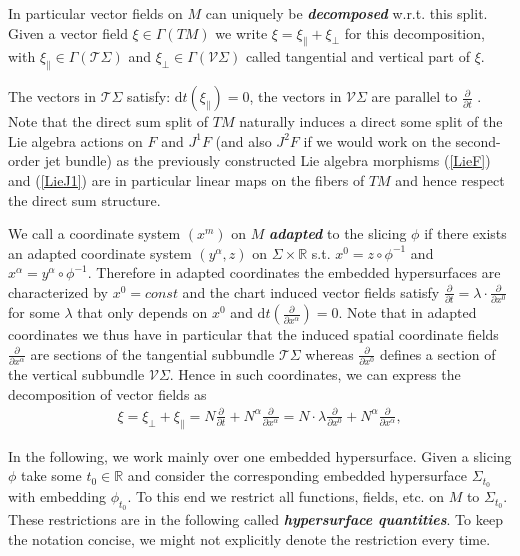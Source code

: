 \documentclass[a4paper,12pt, DIV=14, BCOR=5mm, twoside, headsepline, numbers=noenddot]{scrbook}
\begin{document}
In particular vector fields on $M$ can uniquely be \textit{\textbf{decomposed}} w.r.t. this split. Given a vector field $\xi \in \Gamma(TM)$ we write $\xi = \xi_{\parallel} + \xi_{\perp} $ for this decomposition, with $\xi_{\parallel} \in \Gamma(\mathcal{T}\Sigma)$ and $\xi_{\perp} \in \Gamma(\mathcal{V}\Sigma)$ called tangential and vertical part of $\xi$.

The vectors in $\mathcal{T}\Sigma$ satisfy: $\mathrm{d}t(\xi_{\parallel})=0$, the vectors in $\mathcal{V}\Sigma$ are parallel to $\frac{\partial}{\partial t}$  . Note that the direct sum split of $TM$ naturally induces a direct some split of the Lie algebra actions on $F$ and $J^1F$ (and also $J^2F$ if we would work on the second-order jet bundle) as the previously constructed Lie algebra morphisms (\ref{LieF}) and (\ref{LieJ1}) are in particular linear maps on the fibers of $TM$ and hence respect the direct sum structure.

We call a coordinate system $(x^m)$ on $M$ \textit{\textbf{adapted}} to the slicing $\phi$ if there exists an adapted coordinate system $(y^{\alpha},z)$ on $\Sigma \times \mathbb{R}$ s.t. $x^0 = z \circ \phi^{-1}$ and $x^{\alpha} = y^{\alpha} \circ \phi^{-1}$. Therefore in adapted coordinates the embedded hypersurfaces are characterized by $x^0 = const$ and the chart induced vector fields satisfy $\frac{\partial}{\partial t} = \lambda \cdot \frac{\partial}{\partial x^0}$ for some $\lambda$ that only depends on $x^0$ and $\mathrm{d}t\left(\frac{\partial}{\partial x^{\alpha}}\right) = 0$.
Note that in adapted coordinates we thus have in particular that the induced spatial coordinate fields $\frac{\partial}{\partial x^{\alpha}}$ are sections of the tangential subbundle $\mathcal{T}\Sigma$ whereas $\frac{\partial}{\partial x^0}$ defines a section of the vertical subbundle $\mathcal{V}\Sigma$. Hence in such coordinates, we can express the decomposition of vector fields as 
\begin{align}
    \xi = \xi_{\perp} + \xi_{\parallel} = N  \frac{\partial }{\partial t} + N^{\alpha} \frac{\partial}{\partial x^{\alpha}} = N \cdot \lambda \frac{\partial}{\partial x^0} + N^{\alpha} \frac{\partial}{\partial x^{\alpha}},
\end{align}

In the following, we work mainly over one embedded hypersurface. Given a slicing $\phi$ take some $t_0 \in \mathbb{R}$ and consider the corresponding embedded hypersurface $\Sigma_{t_0}$ with embedding $\phi_{t_0}$. To this end we restrict all functions, fields, etc. on $M$ to $\Sigma_{t_0}$. These restrictions are in the following called \textbf{\textit{hypersurface quantities}}. To keep the notation concise, we might not explicitly denote the restriction every time. 
\end{document}
